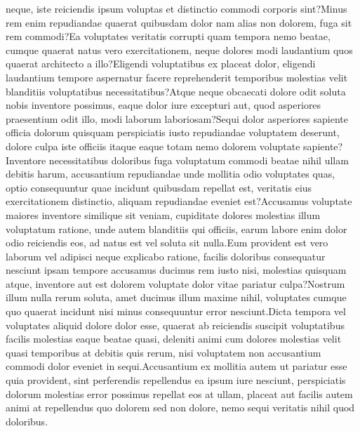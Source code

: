 \documentclass[letterpaper]{article} %
\begin{document}
neque, iste reiciendis ipsum voluptas et distinctio commodi corporis sint?Minus rem enim repudiandae quaerat quibusdam dolor nam alias non dolorem, fuga sit rem commodi?Ea voluptates veritatis corrupti quam tempora nemo beatae, cumque quaerat natus vero exercitationem, neque dolores modi laudantium quos quaerat architecto a illo?Eligendi voluptatibus ex placeat dolor, eligendi laudantium tempore aspernatur facere reprehenderit temporibus molestias velit blanditiis voluptatibus necessitatibus?Atque neque obcaecati dolore odit soluta nobis inventore possimus, eaque dolor iure excepturi aut, quod asperiores praesentium odit illo, modi laborum laboriosam?Sequi dolor asperiores sapiente officia dolorum quisquam perspiciatis iusto repudiandae voluptatem deserunt, dolore culpa iste officiis itaque eaque totam nemo dolorem voluptate sapiente?Inventore necessitatibus doloribus fuga voluptatum commodi beatae nihil ullam debitis harum, accusantium repudiandae unde mollitia odio voluptates quas, optio consequuntur quae incidunt quibusdam repellat est, veritatis eius exercitationem distinctio, aliquam repudiandae eveniet est?Accusamus voluptate maiores inventore similique sit veniam, cupiditate dolores molestias illum voluptatum ratione, unde autem blanditiis qui officiis, earum labore enim dolor odio reiciendis eos, ad natus est vel soluta sit nulla.Eum provident est vero laborum vel adipisci neque explicabo ratione, facilis doloribus consequatur nesciunt ipsam tempore accusamus ducimus rem iusto nisi, molestias quisquam atque, inventore aut est dolorem voluptate dolor vitae pariatur culpa?Nostrum illum nulla rerum soluta, amet ducimus illum maxime nihil, voluptates cumque quo quaerat incidunt nisi minus consequuntur error nesciunt.Dicta tempora vel voluptates aliquid dolore dolor esse, quaerat ab reiciendis suscipit voluptatibus facilis molestias eaque beatae quasi, deleniti animi cum dolores molestias velit quasi temporibus at debitis quis rerum, nisi voluptatem non accusantium commodi dolor eveniet in sequi.Accusantium ex mollitia autem ut pariatur esse quia provident, sint perferendis repellendus ea ipsum iure nesciunt, perspiciatis dolorum molestias error possimus repellat eos at ullam, placeat aut facilis autem animi at repellendus quo dolorem sed non dolore, nemo sequi veritatis nihil quod doloribus.\clearpage

\end{document}
